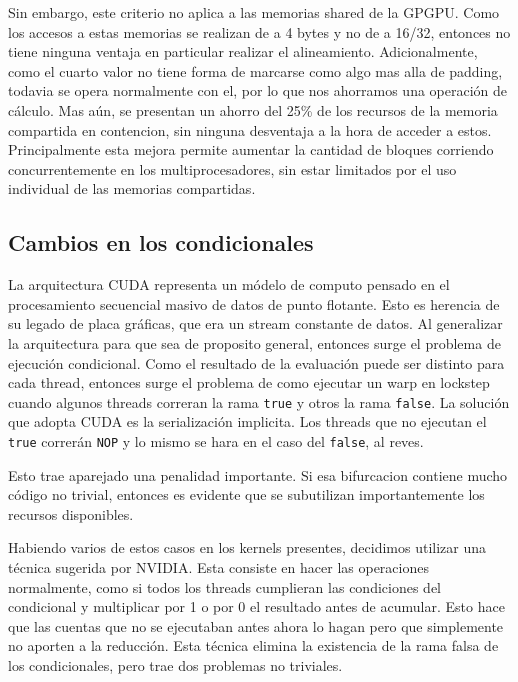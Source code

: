 Sin embargo, este criterio no aplica a las memorias shared de la GPGPU. Como los accesos
a estas memorias se realizan de a 4 bytes y no de a 16/32, entonces no tiene ninguna ventaja
en particular realizar el alineamiento. Adicionalmente, como el cuarto valor no tiene forma de marcarse
como algo mas alla de padding, todavia se opera normalmente con el, por lo que nos ahorramos una
operaci\'on de c\'alculo. Mas a\'un, se presentan un ahorro del 25\% de los recursos de la memoria compartida
en contencion, sin ninguna desventaja a la hora de acceder a estos. Principalmente
esta mejora permite aumentar la cantidad de bloques corriendo concurrentemente en los multiprocesadores,
sin estar limitados por el uso individual de las memorias compartidas.

\subsection{Cambios en los condicionales}
La arquitectura CUDA representa un m\'odelo de computo pensado en el procesamiento secuencial masivo
de datos de punto flotante. Esto es herencia de su legado de placa gr\'aficas, que era un stream
constante de datos. Al generalizar la arquitectura para que sea de proposito general, entonces
surge el problema de ejecuci\'on condicional. Como el resultado de la evaluaci\'on puede ser distinto
para cada thread, entonces surge el problema de como ejecutar un warp en lockstep cuando algunos threads
correran la rama \texttt{true} y otros la rama \texttt{false}. La soluci\'on que adopta CUDA es la
serializaci\'on implicita. Los threads que no ejecutan el \texttt{true} correr\'an \texttt{NOP}
y lo mismo se hara en el caso del \texttt{false}, al reves.

Esto trae aparejado una penalidad importante. Si esa bifurcacion contiene mucho c\'odigo no trivial,
entonces es evidente que se subutilizan importantemente los recursos disponibles.

Habiendo varios de estos casos en los kernels presentes, decidimos utilizar una t\'ecnica sugerida
por NVIDIA. Esta consiste en hacer las operaciones normalmente, como si todos los threads cumplieran
las condiciones del condicional y multiplicar por 1 o por 0 el resultado antes de acumular.
Esto hace que las cuentas que no se ejecutaban antes ahora lo hagan pero que simplemente no aporten
a la reducci\'on. Esta t\'ecnica elimina la existencia de la rama falsa de los condicionales, pero
trae dos problemas no triviales.

